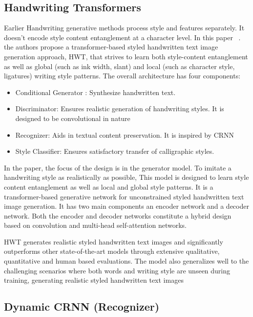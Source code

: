 \documentclass[10pt,twocolumn,letterpaper]{article}
\begin{document}
\subsection{Handwriting Transformers\cite{HWT}}
\label{subsec: HWT}
Earlier Handwriting generative methods process style and features separately. It doesn't encode style content entanglement at a character level. In this paper ~\cite{HWT}. the authors propose a transformer-based styled handwritten text image generation approach, HWT, that strives to learn both style-content entanglement as well as global (such as ink width, slant) and local (such as character style, ligatures) writing style patterns. The overall architecture has four components: 
\begin{itemize}
  \item Conditional Generator : Synthesize handwritten text.
  \item Discriminator: Ensures realistic generation of handwriting styles. It is designed to be convolutional in nature
  \item Recognizer: Aids in textual content preservation. It is inspired by CRNN
  \item Style Classifier: Ensures satisfactory transfer of calligraphic styles.
\end{itemize}

In the paper, the focus of the design is in the generator model. To imitate a handwriting style as realistically as possible, This model is designed to learn style content entanglement as well as local and global style patterns.  It is a transformer-based generative network for unconstrained styled handwritten text image generation.  It has two main components an encoder network and a decoder network.  Both the encoder and decoder networks constitute a hybrid design based on convolution and multi-head self-attention networks.

HWT generates realistic styled handwritten text images and significantly outperforms other state-of-the-art models through extensive qualitative, quantitative and human based evaluations. The model also generalizes well to the challenging scenarios where both words and writing style are unseen during training, generating realistic styled handwritten text images 

\subsection{Dynamic CRNN (Recognizer)\cite{crnn}}
\label{subsec: CRNN}
\end{document}
